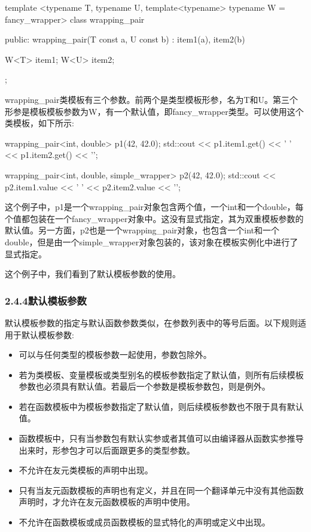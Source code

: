 \begin{cpp}
template <typename T, typename U,
		  template<typename> typename W = fancy_wrapper>
class wrapping_pair
{
public:
	wrapping_pair(T const a, U const b) :
		item1(a), item2(b)
	{
	}

	W<T> item1;
	W<U> item2;
};
\end{cpp}

wrapping\_pair类模板有三个参数。前两个是类型模板形参，名为T和U。第三个形参是模板模板参数为W，有一个默认值，即fancy\_wrapper类型。可以使用这个类模板，如下所示:

\begin{cpp}
wrapping_pair<int, double> p1(42, 42.0);
std::cout << p1.item1.get() << ' '
		  << p1.item2.get() << '\n';

wrapping_pair<int, double, simple_wrapper> p2(42, 42.0);
std::cout << p2.item1.value << ' '
		  << p2.item2.value << '\n';
\end{cpp}

这个例子中，p1是一个wrapping\_pair对象包含两个值，一个int和一个double，每个值都包装在一个fancy\_wrapper对象中。这没有显式指定，其为双重模板参数的默认值。另一方面，p2也是一个wrapping\_pair对象，也包含一个int和一个double，但是由一个simple\_wrapper对象包装的，该对象在模板实例化中进行了显式指定。

这个例子中，我们看到了默认模板参数的使用。

\subsubsection{2.4.4\hspace{0.2cm}默认模板参数}

默认模板参数的指定与默认函数参数类似，在参数列表中的等号后面。以下规则适用于默认模板参数:

\begin{itemize}
\item 
可以与任何类型的模板参数一起使用，参数包除外。

\item 
若为类模板、变量模板或类型别名的模板参数指定了默认值，则所有后续模板参数也必须具有默认值。若最后一个参数是模板参数包，则是例外。

\item 
若在函数模板中为模板参数指定了默认值，则后续模板参数也不限于具有默认值。

\item 
函数模板中，只有当参数包有默认实参或者其值可以由编译器从函数实参推导出来时，形参包才可以后面跟更多的类型参数。

\item 
不允许在友元类模板的声明中出现。

\item 
只有当友元函数模板的声明也有定义，并且在同一个翻译单元中没有其他函数声明时，才允许在友元函数模板的声明中使用。

\item 
不允许在函数模板或成员函数模板的显式特化的声明或定义中出现。
\end{itemize}


